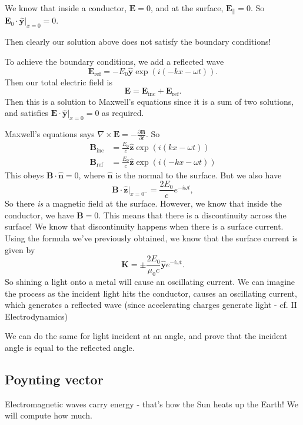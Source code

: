 \documentclass[a4paper]{article}
\begin{document}
We know that inside a conductor, $\mathbf{E} = 0$, and at the surface, $\mathbf{E}_{\parallel} = 0$. So $\mathbf{E}_0 \cdot \hat{\mathbf{y}}|_{x = 0} = 0$.

Then clearly our solution above does not satisfy the boundary conditions!

To achieve the boundary conditions, we add a reflected wave
\[
  \mathbf{E}_{\mathrm{ref}} = -E_0 \hat{\mathbf{y}} \exp(i(-kx - \omega t)).
\]
Then our total electric field is
\[
  \mathbf{E} = \mathbf{E}_{\mathrm{inc}} + \mathbf{E}_{\mathrm{ref}}.
\]
Then this is a solution to Maxwell's equations since it is a sum of two solutions, and satisfies $\mathbf{E}\cdot \hat{\mathbf{y}}|_{x = 0} = 0$ as required.

Maxwell's equations says $\nabla\times \mathbf{E} = -\frac{\partial \mathbf{B}}{\partial t}$. So
\begin{align*}
  \mathbf{B}_{\mathrm{inc}} &= \frac{E_0}{c}\hat{\mathbf{z}} \exp(i(kx - \omega t))\\
  \mathbf{B}_{\mathrm{ref}} &= \frac{E_0}{c}\hat{\mathbf{z}} \exp(i(-kx - \omega t))
\end{align*}
This obeys $\mathbf{B}\cdot \hat{\mathbf{n}} = 0$, where $\hat{\mathbf{n}}$ is the normal to the surface. But we also have
\[
  \mathbf{B}\cdot \hat{\mathbf{z}}|_{x = 0^-} = \frac{2E_0}{c}e^{-i\omega t},
\]
So there \emph{is} a magnetic field at the surface. However, we know that inside the conductor, we have $\mathbf{B} = 0$. This means that there is a discontinuity across the surface! We know that discontinuity happens when there is a surface current. Using the formula we've previously obtained, we know that the surface current is given by
\[
  \mathbf{K} = \pm\frac{2E_0}{\mu_0 c}\hat{\mathbf{y}} e^{-i \omega t}.
\]
So shining a light onto a metal will cause an oscillating current. We can imagine the process as the incident light hits the conductor, causes an oscillating current, which generates a reflected wave (since accelerating charges generate light - cf. II Electrodynamics)

We can do the same for light incident at an angle, and prove that the incident angle is equal to the reflected angle.

\subsection{Poynting vector}
Electromagnetic waves carry energy - that's how the Sun heats up the Earth! We will compute how much.
\end{document}
